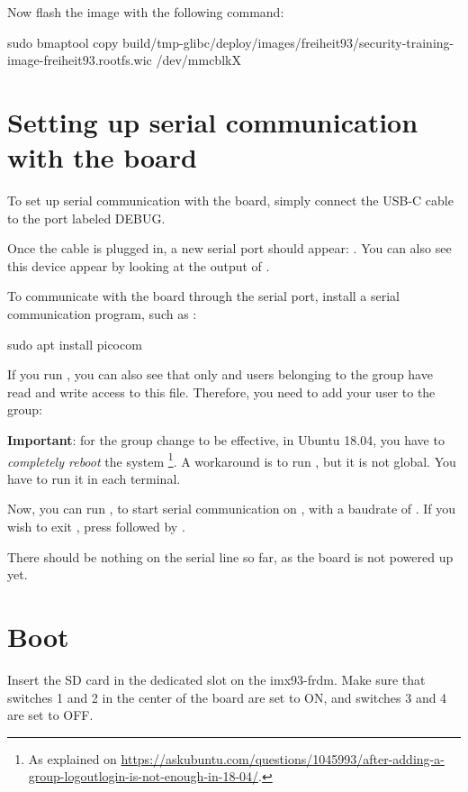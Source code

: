 Now flash the image with the following command:
\begin{bashinput}
sudo bmaptool copy build/tmp-glibc/deploy/images/freiheit93/security-training-image-freiheit93.rootfs.wic /dev/mmcblkX
\end{bashinput}

\section{Setting up serial communication with the board}
To set up serial communication with the board, simply connect the USB-C cable to
the port labeled DEBUG.

Once the cable is plugged in, a new serial port should appear:
.
You can also see this device appear by looking at the output of .

To communicate with the board through the serial port, install a
serial communication program, such as :

\begin{bashinput}
sudo apt install picocom
\end{bashinput}

If you run , you can also see that only
 and users belonging to the  group have
read and write access to this file.
Therefore, you need to add your user to the  group:


{\bf Important}: for the group change to be effective, in Ubuntu 18.04, you have to
{\em completely reboot} the system \footnote{As explained on
\url{https://askubuntu.com/questions/1045993/after-adding-a-group-logoutlogin-is-not-enough-in-18-04/}.}.
A workaround is to run , but it is not global.
You have to run it in each terminal.

Now, you can run , to start serial
communication on , with a baudrate of .
If you wish to exit , press \code{[Ctrl][a]} followed by
\code{[Ctrl][x]}.

There should be nothing on the serial line so far, as the board is not
powered up yet.

\section{Boot}
Insert the SD card in the dedicated slot on the imx93-frdm.
Make sure that switches 1 and 2 in the center of the board are set to ON, and
switches 3 and 4 are set to OFF.

